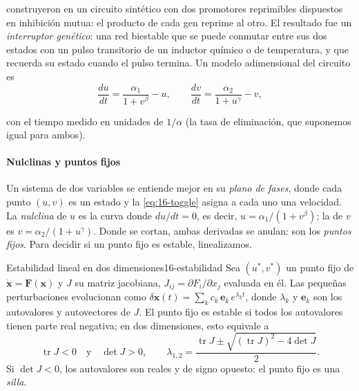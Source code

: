 \textcite{c16-gardner2000} construyeron en  un circuito sintético con dos promotores reprimibles dispuestos en inhibición mutua: el producto de cada gen reprime al otro. El resultado fue un \emph{interruptor genético}: una red biestable que se puede conmutar entre sus dos estados con un pulso transitorio de un inductor químico o de temperatura, y que recuerda su estado cuando el pulso termina. Un modelo adimensional del circuito es
\begin{equation}\label{eq:16-toggle}
\frac{du}{dt}=\frac{\alpha_1}{1+v^{\beta}}-u,\qquad
\frac{dv}{dt}=\frac{\alpha_2}{1+u^{\gamma}}-v,
\end{equation}
\begin{simbolos}
\end{simbolos}
con el tiempo medido en unidades de $1/\alpha$ (la tasa de eliminación, que suponemos igual para ambos).

\paragraph{Nulclinas y puntos fijos} Un sistema de dos variables se entiende mejor en su \emph{plano de fases}, donde cada punto $(u,v)$ es un estado y la \cref{eq:16-toggle} asigna a cada uno una velocidad. La \emph{nulclina} de $u$ es la curva donde $du/dt=0$, es decir, $u=\alpha_1/(1+v^\beta)$; la de $v$ es $v=\alpha_2/(1+u^\gamma)$. Donde se cortan, ambas derivadas se anulan: son los \emph{puntos fijos}. Para decidir si un punto fijo es estable, linealizamos.

\begin{teorema}{Estabilidad lineal en dos dimensiones}{16-estabilidad}
Sea $(u^*,v^*)$ un punto fijo de $\dot{\mathbf{x}}=\mathbf{F}(\mathbf{x})$ y $J$ su matriz jacobiana, $J_{ij}=\partial F_i/\partial x_j$ evaluada en él. Las pequeñas perturbaciones evolucionan como $\delta\mathbf{x}(t)=\sum_k c_k\,\mathbf{e}_k\,e^{\lambda_k t}$, donde $\lambda_k$ y $\mathbf{e}_k$ son los autovalores y autovectores de $J$. El punto fijo es estable si todos los autovalores tienen parte real negativa; en dos dimensiones, esto equivale a
\begin{equation}\label{eq:16-trdet}
\operatorname{tr}J<0\quad\text{y}\quad\det J>0,\qquad
\lambda_{1,2}=\frac{\operatorname{tr}J\pm\sqrt{(\operatorname{tr}J)^2-4\det J}}{2}.
\end{equation}
Si $\det J<0$, los autovalores son reales y de signo opuesto: el punto fijo es una \emph{silla}.
\end{teorema}
\begin{simbolos}
\end{simbolos}

